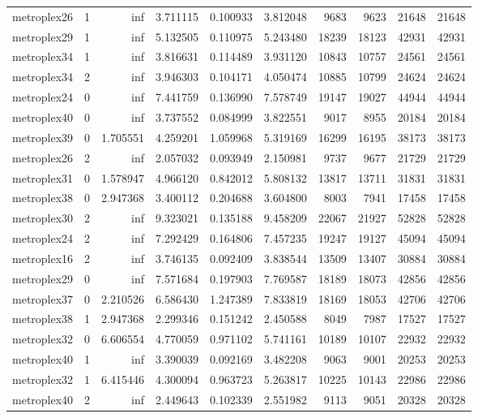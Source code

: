 \begin{longtable}{|l|r|r|r|r|r|r|r|r|r|}
metroplex26 & 1 & inf & 3.711115 & 0.100933 & 3.812048 & 9683 & 9623 & 21648 & 21648 \\
metroplex29 & 1 & inf & 5.132505 & 0.110975 & 5.243480 & 18239 & 18123 & 42931 & 42931 \\
metroplex34 & 1 & inf & 3.816631 & 0.114489 & 3.931120 & 10843 & 10757 & 24561 & 24561 \\
metroplex34 & 2 & inf & 3.946303 & 0.104171 & 4.050474 & 10885 & 10799 & 24624 & 24624 \\
metroplex24 & 0 & inf & 7.441759 & 0.136990 & 7.578749 & 19147 & 19027 & 44944 & 44944 \\
metroplex40 & 0 & inf & 3.737552 & 0.084999 & 3.822551 & 9017 & 8955 & 20184 & 20184 \\
metroplex39 & 0 & 1.705551 & 4.259201 & 1.059968 & 5.319169 & 16299 & 16195 & 38173 & 38173 \\
metroplex26 & 2 & inf & 2.057032 & 0.093949 & 2.150981 & 9737 & 9677 & 21729 & 21729 \\
metroplex31 & 0 & 1.578947 & 4.966120 & 0.842012 & 5.808132 & 13817 & 13711 & 31831 & 31831 \\
metroplex38 & 0 & 2.947368 & 3.400112 & 0.204688 & 3.604800 & 8003 & 7941 & 17458 & 17458 \\
metroplex30 & 2 & inf & 9.323021 & 0.135188 & 9.458209 & 22067 & 21927 & 52828 & 52828 \\
metroplex24 & 2 & inf & 7.292429 & 0.164806 & 7.457235 & 19247 & 19127 & 45094 & 45094 \\
metroplex16 & 2 & inf & 3.746135 & 0.092409 & 3.838544 & 13509 & 13407 & 30884 & 30884 \\
metroplex29 & 0 & inf & 7.571684 & 0.197903 & 7.769587 & 18189 & 18073 & 42856 & 42856 \\
metroplex37 & 0 & 2.210526 & 6.586430 & 1.247389 & 7.833819 & 18169 & 18053 & 42706 & 42706 \\
metroplex38 & 1 & 2.947368 & 2.299346 & 0.151242 & 2.450588 & 8049 & 7987 & 17527 & 17527 \\
metroplex32 & 0 & 6.606554 & 4.770059 & 0.971102 & 5.741161 & 10189 & 10107 & 22932 & 22932 \\
metroplex40 & 1 & inf & 3.390039 & 0.092169 & 3.482208 & 9063 & 9001 & 20253 & 20253 \\
metroplex32 & 1 & 6.415446 & 4.300094 & 0.963723 & 5.263817 & 10225 & 10143 & 22986 & 22986 \\
metroplex40 & 2 & inf & 2.449643 & 0.102339 & 2.551982 & 9113 & 9051 & 20328 & 20328 \\

\end{longtable}
